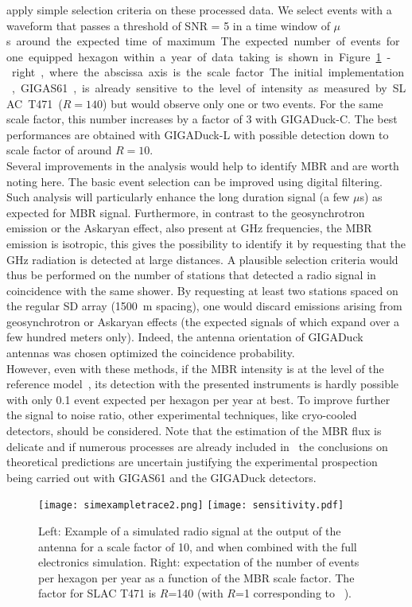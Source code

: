 apply simple  selection criteria on  these processed data.   We select
events with a  waveform that passes a  threshold of SNR = 5  in a time
window of  \unit[1]{$\mu$s} around the expected time  of maximum.  The
expected number  of events for one  equipped hexagon within  a year of
data taking is  shown in Figure~\ref{fig:yieldnormal}-right, where the
abscissa  axis  is  the  scale factor.   The  initial  implementation,
\mbox{GIGAS61},  is already  sensitive to  the level  of  intensity as
measured by  SLAC T471 ($R = 140$)  but would observe only  one or two
events.  For the same scale  factor, this number increases by a factor
of  3  with  \mbox{GIGADuck-C}.   The  best performances  are  obtained  with
\mbox{GIGADuck-L} with possible detection down to scale factor of around $R =
10$.\\Several improvements in the  analysis would help to identify MBR
and are worth noting here.   The basic event selection can be improved
using digital filtering.  Such  analysis will particularly enhance the
long  duration signal  (a  few  $\mu$s) as  expected  for MBR  signal.
Furthermore,  in  contrast  to  the  geosynchrotron  emission  or  the
Askaryan effect, also present at  GHz frequencies, the MBR emission is
isotropic,  this gives the  possibility to  identify it  by requesting
that the  GHz radiation is  detected at large distances.   A plausible
selection criteria would  thus be performed on the  number of stations
that detected a  radio signal in coincidence with  the same shower. By
requesting  at least  two  stations  spaced on  the  regular SD  array
(1500~m   spacing),   one  would   discard   emissions  arising   from
geosynchrotron  or Askaryan  effects  (the expected  signals of  which
expand  over  a  few   hundred  meters  only).   Indeed,  the  antenna
orientation of GIGADuck antennas  was chosen optimized the coincidence
probability.  \\However, even with these methods, if the MBR intensity
is at the level  of the reference model~\cite{imen2016}, its detection
with the presented instruments is  hardly possible with only 0.1 event
expected per hexagon per year  at best.  To improve further the signal
to  noise  ratio,  other  experimental  techniques,  like  cryo-cooled
detectors, should be  considered. Note that the estimation  of the MBR
flux  is  delicate and  if  numerous  processes  are already  included
in~\cite{imen2016}  the  conclusions  on theoretical  predictions  are
uncertain  justifying the experimental  prospection being  carried out
with \mbox{GIGAS61} and the GIGADuck detectors.
\begin{figure}[t!]
\centering \texttt{[image: simexampletrace2.png]}
\texttt{[image: sensitivity.pdf]}
\caption{Left: Example  of a simulated  radio signal at the  output of
  the antenna  for a scale  factor of 10,  and when combined  with the
  full electronics  simulation.  Right:  expectation of the  number of
  events  per  hexagon  per  year  as  a function  of  the  MBR  scale
  factor.   The  factor  for   SLAC  T471   is  $R$=140   (with  $R$=1
  corresponding to~\cite{imen2016} ).}
\label{fig:yieldnormal}
\end{figure}  
